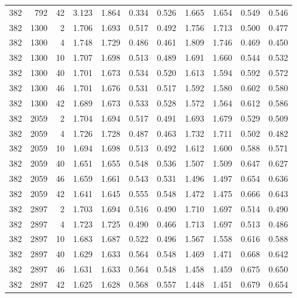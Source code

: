 \documentclass[journal=jacsat,manuscript=article]{achemso}
\begin{document}
\begin{table}
\begin{tabular}{rrr|rrrr|rrrr}
382 & 792 & 42 & 3.123 & 1.864 & 0.334 & 0.526 & 1.665 & 1.654 & 0.549 & 0.546\\
382 & 1300 & 2 & 1.706 & 1.693 & 0.517 & 0.492 & 1.756 & 1.713 & 0.500 & 0.477\\
382 & 1300 & 4 & 1.748 & 1.729 & 0.486 & 0.461 & 1.809 & 1.746 & 0.469 & 0.450\\
382 & 1300 & 10 & 1.707 & 1.698 & 0.513 & 0.489 & 1.691 & 1.660 & 0.544 & 0.532\\
382 & 1300 & 40 & 1.701 & 1.673 & 0.534 & 0.520 & 1.613 & 1.594 & 0.592 & 0.572\\
382 & 1300 & 46 & 1.701 & 1.676 & 0.531 & 0.517 & 1.592 & 1.580 & 0.602 & 0.580\\
382 & 1300 & 42 & 1.689 & 1.673 & 0.533 & 0.528 & 1.572 & 1.564 & 0.612 & 0.586\\
382 & 2059 & 2 & 1.704 & 1.694 & 0.517 & 0.491 & 1.693 & 1.679 & 0.529 & 0.509\\
382 & 2059 & 4 & 1.726 & 1.728 & 0.487 & 0.463 & 1.732 & 1.711 & 0.502 & 0.482\\
382 & 2059 & 10 & 1.694 & 1.698 & 0.513 & 0.492 & 1.612 & 1.600 & 0.588 & 0.571\\
382 & 2059 & 40 & 1.651 & 1.655 & 0.548 & 0.536 & 1.507 & 1.509 & 0.647 & 0.627\\
382 & 2059 & 46 & 1.659 & 1.661 & 0.543 & 0.531 & 1.496 & 1.497 & 0.654 & 0.636\\
382 & 2059 & 42 & 1.641 & 1.645 & 0.555 & 0.548 & 1.472 & 1.475 & 0.666 & 0.643\\
382 & 2897 & 2 & 1.703 & 1.694 & 0.516 & 0.490 & 1.710 & 1.697 & 0.514 & 0.490\\
382 & 2897 & 4 & 1.723 & 1.725 & 0.490 & 0.466 & 1.713 & 1.697 & 0.513 & 0.486\\
382 & 2897 & 10 & 1.683 & 1.687 & 0.522 & 0.496 & 1.567 & 1.558 & 0.616 & 0.588\\
382 & 2897 & 40 & 1.629 & 1.633 & 0.564 & 0.548 & 1.469 & 1.471 & 0.668 & 0.642\\
382 & 2897 & 46 & 1.631 & 1.633 & 0.564 & 0.548 & 1.458 & 1.459 & 0.675 & 0.650\\
382 & 2897 & 42 & 1.625 & 1.628 & 0.568 & 0.557 & 1.448 & 1.451 & 0.679 & 0.654\\
    \hline
  \end{tabular}
\end{table}
\end{document}

